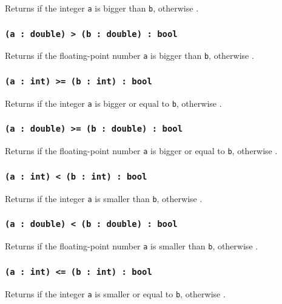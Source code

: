 Returns \true{} if the integer \texttt{a} is bigger than \texttt{b}, otherwise \false{}.

\subsubsection{\texttt{(a : double) > (b : double) : bool}}

Returns \true{} if the floating-point number \texttt{a} is bigger than \texttt{b}, otherwise \false{}.

\subsubsection{\texttt{(a : int) >= (b : int) : bool}}

Returns \true{} if the integer \texttt{a} is bigger or equal to \texttt{b}, otherwise \false{}.

\subsubsection{\texttt{(a : double) >= (b : double) : bool}}

Returns \true{} if the floating-point number \texttt{a} is bigger or equal to \texttt{b}, otherwise \false{}.

\subsubsection{\texttt{(a : int) < (b : int) : bool}}

Returns \true{} if the integer \texttt{a} is smaller than \texttt{b}, otherwise \false{}.

\subsubsection{\texttt{(a : double) < (b : double) : bool}}

Returns \true{} if the floating-point number \texttt{a} is smaller than \texttt{b}, otherwise \false{}.

\subsubsection{\texttt{(a : int) <= (b : int) : bool}}

Returns \true{} if the integer \texttt{a} is smaller or equal to \texttt{b}, otherwise \false{}.

